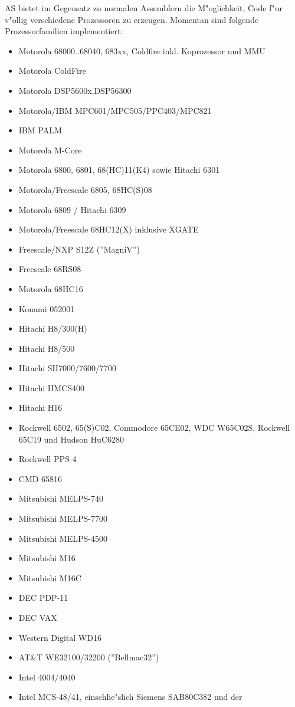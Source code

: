 \documentclass[12pt,a4paper,twoside]{report}
\newcommand{\asname}{AS}
\begin{document}
\asname{} bietet im Gegensatz zu normalen Assemblern die M"oglichkeit, Code
f"ur v"ollig verschiedene Prozessoren zu erzeugen.  Momentan sind
folgende Prozessorfamilien implementiert:
\begin{itemize}
\item{Motorola 68000..68040, 683xx, Coldfire inkl. Koprozessor und MMU}
\item{Motorola ColdFire}
\item{Motorola DSP5600x,DSP56300}
\item{Motorola/IBM MPC601/MPC505/PPC403/MPC821}
\item{IBM PALM}
\item{Motorola M-Core}
\item{Motorola 6800, 6801, 68(HC)11(K4) sowie Hitachi 6301}
\item{Motorola/Freescale 6805, 68HC(S)08}
\item{Motorola 6809 / Hitachi 6309}
\item{Motorola/Freescale 68HC12(X) inklusive XGATE}
\item{Freescale/NXP S12Z (''MagniV'')}
\item{Freescale 68RS08}
\item{Motorola 68HC16}
\item{Konami 052001}
\item{Hitachi H8/300(H)}
\item{Hitachi H8/500}
\item{Hitachi SH7000/7600/7700}
\item{Hitachi HMCS400}
\item{Hitachi H16}
\item{Rockwell 6502, 65(S)C02, Commodore 65CE02, WDC W65C02S, Rockwell 65C19 und
      Hudson HuC6280}
\item{Rockwell PPS-4}
\item{CMD 65816}
\item{Mitsubishi MELPS-740}
\item{Mitsubishi MELPS-7700}
\item{Mitsubishi MELPS-4500}
\item{Mitsubishi M16}
\item{Mitsubishi M16C}
\item{DEC PDP-11}
\item{DEC VAX}
\item{Western Digital WD16}
\item{AT\&T WE32100/32200 (''Bellmac32'')}
\item{Intel 4004/4040}
\item{Intel MCS-48/41, einschlie"slich Siemens SAB80C382 und der
}
\end{itemize}
\end{document}

